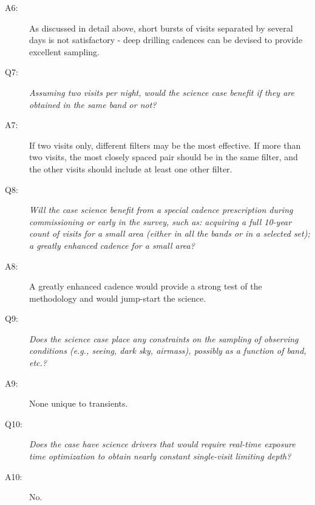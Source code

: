 \begin{description}
 \item[A6:] As discussed in detail above, short bursts of visits separated by several days is not
satisfactory - deep drilling cadences can be devised to provide excellent sampling.

 \item[Q7:] {\it Assuming two visits per night, would the science case
 benefit if they are obtained in the same band or not?}

 \item[A7:] If two visits only, different filters may be the most effective. If more than two visits, the most closely spaced pair should be in the same filter, and the other visits should include at least one other filter.

 \item[Q8:] {\it Will the case science benefit from a special cadence
 prescription during commissioning or early in the survey, such as:
 acquiring a full 10-year count of visits for a small area (either in all
 the bands or in a  selected set); a greatly enhanced cadence for a small
 area?}

 \item[A8:] A greatly enhanced cadence would provide a strong test of the methodology and would jump-start the science.

 \item[Q9:] {\it Does the science case place any constraints on the
 sampling of observing conditions (e.g., seeing, dark sky, airmass),
 possibly as a function of band, etc.?}

 \item[A9:] None unique to transients.

 \item[Q10:] {\it Does the case have science drivers that would require
 real-time exposure time optimization to obtain nearly constant
 single-visit limiting depth?}

 \item[A10:] No.

 \end{description}
